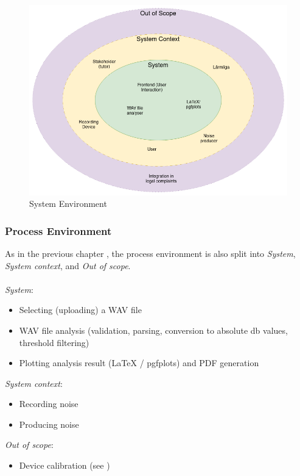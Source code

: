 \begin{figure}[H]
    \centering
    \includegraphics[width=1\textwidth]{../assets/system_environment.png}
    \caption{System Environment}\label{fig:system-environment}
\end{figure}

\subsubsection{Process Environment}\label{subsubsec:process_environment}
As in the previous chapter , the process environment is also split into \textit{System}, \textit{System context}, and \textit{Out of scope}. \\~\\
\textit{System}:
\begin{itemize}
    \item Selecting (uploading) a WAV file
    \item WAV file analysis (validation, parsing, conversion to absolute db values, threshold filtering)
    \item Plotting analysis result (LaTeX / pgfplots) and PDF generation
\end{itemize}
\textit{System context}:
\begin{itemize}
    \item Recording noise
    \item Producing noise
\end{itemize}
\textit{Out of scope}:
\begin{itemize}
    \item Device calibration (see )
\end{itemize}

